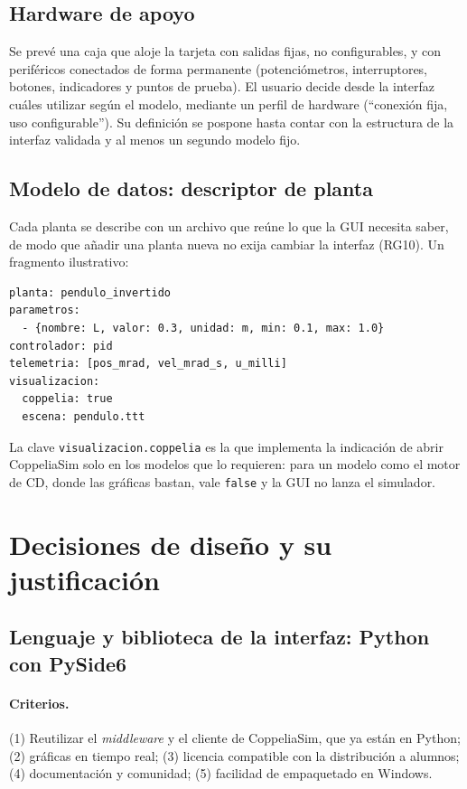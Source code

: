 \documentclass[12pt,letterpaper]{article}
\begin{document}
\subsection{Hardware de apoyo}
\label{sec:hw_prev}

Se prevé una caja que aloje la tarjeta con salidas fijas, no configurables, y con periféricos conectados de forma permanente (potenciómetros, interruptores, botones, indicadores y puntos de prueba). El usuario decide desde la interfaz cuáles utilizar según el modelo, mediante un perfil de hardware (``conexión fija, uso configurable''). Su definición se pospone hasta contar con la estructura de la interfaz validada y al menos un segundo modelo fijo.

\subsection{Modelo de datos: descriptor de planta}

Cada planta se describe con un archivo que reúne lo que la GUI necesita saber, de modo que añadir una planta nueva no exija cambiar la interfaz (RG10). Un fragmento ilustrativo:
\begin{lstlisting}
planta: pendulo_invertido
parametros:
  - {nombre: L, valor: 0.3, unidad: m, min: 0.1, max: 1.0}
controlador: pid
telemetria: [pos_mrad, vel_mrad_s, u_milli]
visualizacion:
  coppelia: true
  escena: pendulo.ttt
\end{lstlisting}
La clave \texttt{visualizacion.coppelia} es la que implementa la indicación de abrir CoppeliaSim solo en los modelos que lo requieren: para un modelo como el motor de CD, donde las gráficas bastan, vale \texttt{false} y la GUI no lanza el simulador.

\section{Decisiones de diseño y su justificación}
\label{sec:decisiones}

\subsection{Lenguaje y biblioteca de la interfaz: Python con PySide6}
\label{sec:dec_lenguaje}

\paragraph{Criterios.} (1) Reutilizar el \textit{middleware} y el cliente de CoppeliaSim, que ya están en Python; (2) gráficas en tiempo real; (3) licencia compatible con la distribución a alumnos; (4) documentación y comunidad; (5) facilidad de empaquetado en Windows.
\end{document}
